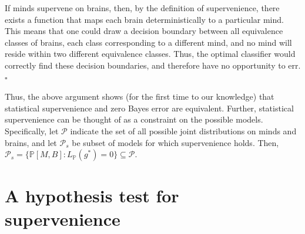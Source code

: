 \documentclass{article}
\newcommand{\PP}{\mathbb{P}}           %
\providecommand{\mc}[1]{\mathcal{#1}}
\begin{document}
\noindent If minds supervene on brains, then, by the definition of supervenience, there exists a function that maps each brain deterministically to a particular mind.  This means that one could draw a decision boundary between all equivalence classes of brains, each class corresponding to a different mind, and no mind will reside within two different equivalence classes.  Thus, the optimal classifier would correctly find these decision boundaries, and therefore have no opportunity to err. $\square$

Thus, the above argument shows (for the first time to our knowledge) that statistical supervenience and zero Bayes error are equivalent. Further, statistical supervenience can be thought of as a constraint on the possible models.  Specifically, let $\mc{P}$ indicate the set of all possible joint distributions on minds and brains, and let $\mc{P}_s$ be subset of models for which supervenience holds.  Then, $\mc{P}_s = \{\PP[M,B] : L_{\PP}(g^*)=0\} \subseteq \mc{P}$.


\section{A hypothesis test for supervenience} %
\label{sub:hypothesis_testing}
\end{document}
